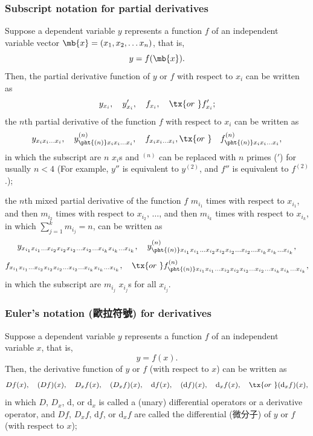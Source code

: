 \subsubsection{Subscript notation for partial derivatives}
Suppose a dependent variable $y$ represents a function $f$ of an independent variable vector $\mb{x}=(x_1,x_2,\dots x_n)$, that is,
\[y=f(\mb{x}).\]
Then, the partial derivative function of $y$ or $f$ with respect to $x_i$ can be written as
\[y_{x_i},\quad y'_{x_i},\quad f_{x_i},\quad \tx{or\ }f'_{x_i};\]
the $n$th partial derivative of the function $f$ with respect to $x_i$ can be written as
\[y_{x_ix_i\dots  x_i},\quad y^{(n)}_{\pht{(n)}x_ix_i\dots  x_i},\quad f_{x_ix_i\dots  x_i},\tx{or\ }\quad f^{(n)}_{\pht{(n)}x_ix_i\dots  x_i},\]
in which the subscript are $n$ $x_i$s and $^{(n)}$ can be replaced with $n$ primes ($'$) for usually $n<4$ (For example, $y''$ is equivalent to $y^{(2)}$, and $f''$ is equivalent to $f^{(2)}$.);

the $n$th mixed partial derivative of the function $f$ $m_{i_1}$ times with respect to $x_{i_1}$, and then $m_{i_2}$ times with respect to $x_{i_2}$, $\ldots$, and then $m_{i_k}$ times with respect to $x_{i_k}$, in which $\sum_{j=1}^km_{i_j}=n$, can be written as
\[y_{x_{i_1}x_{i_1}\dots  x_{i_2}x_{i_2}x_{i_2}\dots  x_{i_2}\dots  x_{i_k}x_{i_k}\dots  x_{i_k}},\quad y^{(n)}_{\pht{(n)}x_{i_1}x_{i_1}\dots  x_{i_2}x_{i_2}x_{i_2}\dots  x_{i_2}\dots  x_{i_k}x_{i_k}\dots  x_{i_k}},\]
\[f_{x_{i_1}x_{i_1}\dots  x_{i_2}x_{i_2}x_{i_2}\dots  x_{i_2}\dots  x_{i_k}x_{i_k}\dots  x_{i_k}},\quad \tx{or\ }f^{(n)}_{\pht{(n)}x_{i_1}x_{i_1}\dots  x_{i_2}x_{i_2}x_{i_2}\dots  x_{i_2}\dots  x_{i_k}x_{i_k}\dots  x_{i_k}},\]
in which the subscript are $m_{i_j}$ $x_{i_j}$s for all $x_{i_j}$.
\subsubsection{Euler's notation (歐拉符號) for derivatives}
Suppose a dependent variable $y$ represents a function $f$ of an independent variable $x$, that is,
\[y=f(x).\]
Then, the derivative function of $y$ or $f$ (with respect to $x$) can be written as
\[Df(x),\quad(Df)(x),\quad D_xf(x),\quad (D_xf)(x),\quad \mathrm{d}f(x),\quad(\mathrm{d}f)(x),\quad \mathrm{d}_xf(x),\quad \tx{or\ }(\mathrm{d}_xf)(x),\]
in which $D$, $D_x$, $\mathrm{d}$, or $\mathrm{d}_x$ is called a (unary) differential operators or a derivative operator, and  $Df$, $D_xf$, $\mathrm{d}f$, or $\mathrm{d}_xf$ are called the differential (微分子) of $y$ or $f$ (with respect to $x$);

